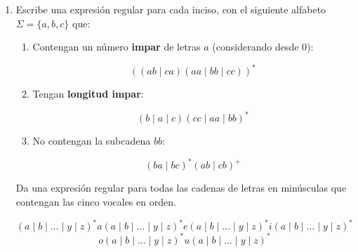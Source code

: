 \documentclass[12pt,letterpaper]{article}
\newcommand{\redcross}{\textcolor{red_cross}{$\times$}}
\begin{document}
\begin{enumerate}[label=\arabic*.]
\begin{table}[H]
\begin{tabular}{
    |C{2.5cm}
    |C{3.3cm}
    |C{10cm}|
}
$\varepsilon$ & \redcross
& No es posible que la cadena vacía sea aceptada por esta regex, ya que el símbolo $a$ después de $(a \mid b)^*$
nos restringe a que mínimo tenga un caracter. Y de nuevo, como anteriormente mencionamos $(a \mid b)(a \mid b)$
obliga a que se eliga alguno de los dos símbolo en ambas opciones, por lo que la regex mínimo genera cadenas de tres caracteres, nunca una vacía.
\\
\hline

\end{tabular}

\end{table}


\newpage


\item Escribe una expresión regular para cada inciso, con el siguiente alfabeto $\Sigma = \{a,b,c\}$ que:

\begin{enumerate}[label=\alph*.]

\item Contengan un número \textbf{impar} de letras $a$ (considerando desde $0$):

  \[
  ((ab \mid ca)(aa \mid bb \mid cc))^*
  \]
  
\item Tengan \textbf{longitud impar}:

  \[
  (b \mid a \mid c)(cc \mid aa \mid bb)^*
  \]
        
\item No contengan la subcadena $bb$:
  
  \[
  (ba \mid bc)^*(ab \mid cb)^+
  \]
  
\end{enumerate}

Da una expresión regular para todas las cadenas de letras en minúsculas que contengan las cinco vocales en orden.

\[
(a \mid b \mid ... \mid y \mid z)^* a (a \mid b \mid ... \mid y \mid z)^* e (a \mid b \mid ... \mid y \mid z)^*
i (a \mid b \mid ... \mid y \mid z)^*
\]
\[
o (a \mid b \mid ... \mid y \mid z)^* u (a \mid b \mid ... \mid y \mid z)^*
\]

\newpage


\end{enumerate}
\end{document}
